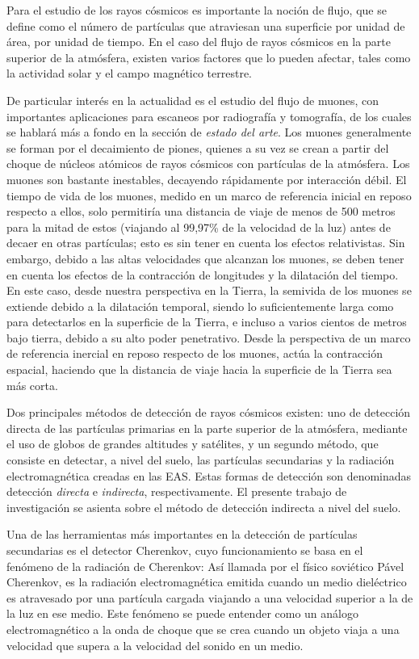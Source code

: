 \documentclass[12pt]{report}
\begin{document}
Para el estudio de los rayos cósmicos es importante la noción de flujo, que se define como el número de partículas que atraviesan una superficie por unidad de área, por unidad de tiempo. En el caso del flujo de rayos cósmicos en la parte superior de la atmósfera, existen varios factores que lo pueden afectar, tales como la actividad solar y el campo magnético terrestre. \cite{PhysRevD.98.030001}

De particular interés en la actualidad es el estudio del flujo de muones, con importantes aplicaciones para escaneos por radiografía y tomografía, de los cuales se hablará más a fondo en la sección de \textit{estado del arte}. Los muones generalmente se forman por el decaimiento de piones, quienes a su vez se crean a partir del choque de núcleos atómicos de rayos cósmicos con partículas de la atmósfera. Los muones son bastante inestables, decayendo rápidamente por interacción débil. El tiempo de vida de los muones, medido en un marco de referencia inicial en reposo respecto a ellos, solo permitiría una distancia de viaje de menos de 500 metros para la mitad de estos (viajando al 99,97\% de la velocidad de la luz) antes de decaer en otras partículas; esto es sin tener en cuenta los efectos relativistas. Sin embargo, debido a las altas velocidades que alcanzan los muones, se deben tener en cuenta los efectos de la contracción de longitudes y la dilatación del tiempo. En este caso, desde nuestra perspectiva en la Tierra, la semivida de los muones se extiende debido a la dilatación temporal, siendo lo suficientemente larga como para detectarlos en la superficie de la Tierra, e incluso a varios cientos de metros bajo tierra, debido a su alto poder penetrativo. Desde la perspectiva de un marco de referencia inercial en reposo respecto de los muones, actúa la contracción espacial, haciendo que la distancia de viaje hacia la superficie de la Tierra sea más corta. \cite{HEP}

Dos principales métodos de detección de rayos cósmicos existen: uno de detección directa de las partículas primarias en la parte superior de la atmósfera, mediante el uso de globos de grandes altitudes y satélites, y un segundo método, que consiste en detectar, a nivel del suelo, las partículas secundarias y la radiación electromagnética creadas en las EAS. Estas formas de detección son denominadas detección \textit{directa} e \textit{indirecta}, respectivamente. El presente trabajo de investigación se asienta sobre el método de detección indirecta a nivel del suelo.

Una de las herramientas más importantes en la detección de partículas secundarias es el detector Cherenkov, cuyo funcionamiento se basa en el fenómeno de la radiación de Cherenkov: Así llamada por el físico soviético Pável Cherenkov, es la radiación electromagnética emitida cuando un medio dieléctrico es atravesado por una partícula cargada viajando a una velocidad superior a la de la luz en ese medio. \cite{Cherenkov} Este fenómeno se puede entender como un análogo electromagnético a la onda de choque que se crea cuando un objeto viaja a una velocidad que supera a la velocidad del sonido en un medio.
\end{document}
